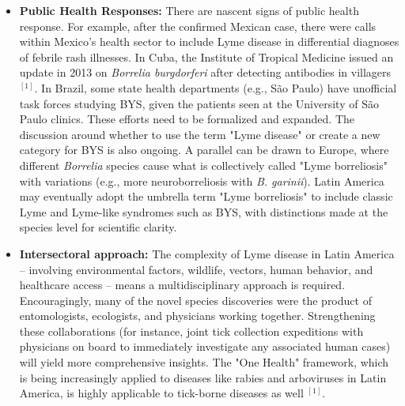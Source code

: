 \documentclass[11pt,letterpaper]{article}
\newcommand{\mycite}[1]{$^{[#1]}$}
\begin{document}
\begin{itemize}
    \item \textbf{Public Health Responses:} There are nascent signs of public health response. For example, after the confirmed Mexican case, there were calls within Mexico's health sector to include Lyme disease in differential diagnoses of febrile rash illnesses. In Cuba, the Institute of Tropical Medicine issued an update in 2013 on \textit{Borrelia burgdorferi} after detecting antibodies in villagers \mycite{1}. In Brazil, some state health departments (e.g., São Paulo) have unofficial task forces studying BYS, given the patients seen at the University of São Paulo clinics. These efforts need to be formalized and expanded. The discussion around whether to use the term "Lyme disease" or create a new category for BYS is also ongoing. A parallel can be drawn to Europe, where different \textit{Borrelia} species cause what is collectively called "Lyme borreliosis" with variations (e.g., more neuroborreliosis with \textit{B. garinii}). Latin America may eventually adopt the umbrella term "Lyme borreliosis" to include classic Lyme and Lyme-like syndromes such as BYS, with distinctions made at the species level for scientific clarity.

    \item \textbf{Intersectoral approach:} The complexity of Lyme disease in Latin America – involving environmental factors, wildlife, vectors, human behavior, and healthcare access – means a multidisciplinary approach is required. Encouragingly, many of the novel species discoveries were the product of entomologists, ecologists, and physicians working together. Strengthening these collaborations (for instance, joint tick collection expeditions with physicians on board to immediately investigate any associated human cases) will yield more comprehensive insights. The "One Health" framework, which is being increasingly applied to diseases like rabies and arboviruses in Latin America, is highly applicable to tick-borne diseases as well \mycite{1}.
\end{itemize}
\end{document}
